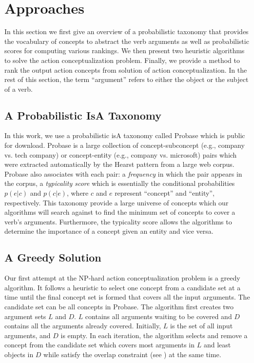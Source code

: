 \section{Approaches}
\label{sec:algo}
In this section we first give an overview of a probabilistic taxonomy
that provides the vocabulary of concepts to abstract the verb arguments
as well as probabilistic scores for computing various rankings.
We then present two heuristic algorithms to solve the action
conceptualization problem. Finally, we provide a method to rank the
output action concepts from solution of action conceptualization.
In the rest of this section, the term ``argument'' refers to either
the object or the subject of a verb.

\subsection{A Probabilistic IsA Taxonomy}
In this work, we use a probabilistic isA taxonomy called Probase
\cite{WuLWZ12} which is public for download.
Probase is a large collection of concept-subconcept (e.g., company vs.
tech company) or concept-entity (e.g., company vs. microsoft) pairs
which were extracted automatically by the Hearst pattern \cite{Hearst92}
from a large web corpus.
Probase also associates with each pair: a {\em frequency} in which
the pair appears in the corpus, a {\em typicality score} which is
essentially the conditional probabilities $p(e | c)$ and $p(c | e)$,
where $c$ and $e$ represent ``concept'' and ``entity'', respectively.
This taxonomy provide a large universe of concepts which
our algorithms will search against to find the minimum set of concepts
to cover a verb's arguments. Furthermore, the typicality score allows
the algorithms to determine the importance of a concept given an entity
and vice versa.

\subsection{A Greedy Solution}
\label{sec:greedy}
Our first attempt at the NP-hard action conceptualization problem
is a greedy algorithm.
It follows a heuristic to select one concept from a candidate set
at a time until the final concept set is formed that covers all
the input arguments.
The candidate set can be all concepts in Probase.
The algorithm first creates two argument sets
$L$ and $D$. $L$ contains all arguments waiting to be covered
and $D$ contains all the arguments already covered. Initially,
$L$ is the set of all input arguments, and $D$ is empty.
In each iteration, the algorithm selects and remove a concept from
the candidate set which covers most arguments
in $L$ and least objects in $D$ while satisfy the overlap constraint
(see ) at the same time.


